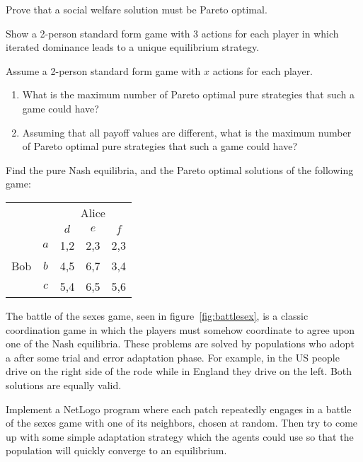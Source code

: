 \begin{exercises}
\item Prove that a social welfare solution must be Pareto optimal.

\item Show a 2-person standard form game with 3 actions for each
  player in which iterated dominance leads to a unique equilibrium
  strategy.
\item Assume a 2-person standard form game with $x$ actions for each
  player.
  \begin{enumerate}
  \item What is the maximum number of Pareto optimal pure strategies
    that such a game could have?
  \item Assuming that all payoff values are different, what is the
    maximum number of Pareto optimal pure strategies that such a game
    could have?
  \end{enumerate}

\item Find the pure Nash equilibria, and the Pareto optimal solutions
  of the following game:

    \begin{center}
      \renewcommand\arraystretch{1.5}
      \begin{tabular}{cc|c|c|c|}
        &    &\multicolumn{3}{c}{Alice} \\ 
        &      &$d$&$e$&$f$ \\ \cline{1-5}
        \multirow{3}{2em}{Bob}
        & $a$  &1,2 &2,3 &2,3 \\ \cline{2-5}
        & $b$  &4,5 &6,7 &3,4 \\ \cline{2-5}
        & $c$  &5,4 &6,5 &5,6 \\ \cline{2-5}
      \end{tabular}
    \end{center}


\item The battle of the sexes game, seen in figure~\ref{fig:battlesex}, is a
  classic coordination game in which the players must somehow
  coordinate to agree upon one of the Nash equilibria. These
  problems are solved by populations who adopt a 
  after some trial and error adaptation phase. For example, in the US
  people drive on the right side of the rode while in England they
  drive on the left. Both solutions are equally valid.

   Implement a NetLogo program where each patch
  repeatedly engages in a battle of the sexes game with one of its
  neighbors, chosen at random. Then try to come up with some simple
  adaptation strategy which the agents could use so that the
  population will quickly converge to an equilibrium.


\end{exercises}
